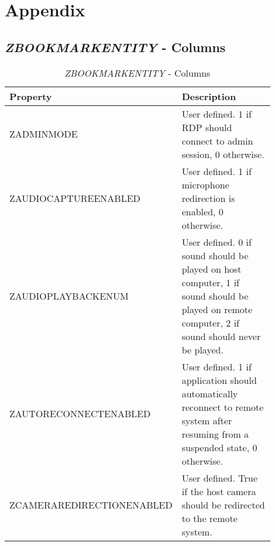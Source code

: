 \documentclass[journal]{IEEEtran}
\begin{document}
\onecolumn
\section{Appendix}

\subsection{\textit{ZBOOKMARKENTITY} - Columns}

\begin{table}[h!]
\caption{\textit{ZBOOKMARKENTITY} - Columns}
\begin{tabular}{p{0.3\linewidth} | p{0.6\linewidth}}
Property                      & Description                                                                                                                                                                                    \\ \hline
ZADMINMODE                    & User defined. 1 if RDP should connect to admin session, 0 otherwise.
                                                                                                                                                                                           \\
ZAUDIOCAPTUREENABLED          & User defined. 1 if microphone redirection is enabled, 0 otherwise.                                                                                                                                                                                           \\
ZAUDIOPLAYBACKENUM            & User defined. 0 if sound should be played on host computer, 1 if sound should be played on remote computer, 2 if sound should never be played.                                                                                                                                                                                           \\
ZAUTORECONNECTENABLED         & User defined. 1 if application should automatically reconnect to remote system after resuming from a suspended state, 0 otherwise.                                                                                                                                                                                           \\
ZCAMERAREDIRECTIONENABLED     & User defined. True if the host camera should be redirected to the remote system.                                                                                                               \\

\end{tabular}
\end{table}
\end{document}
